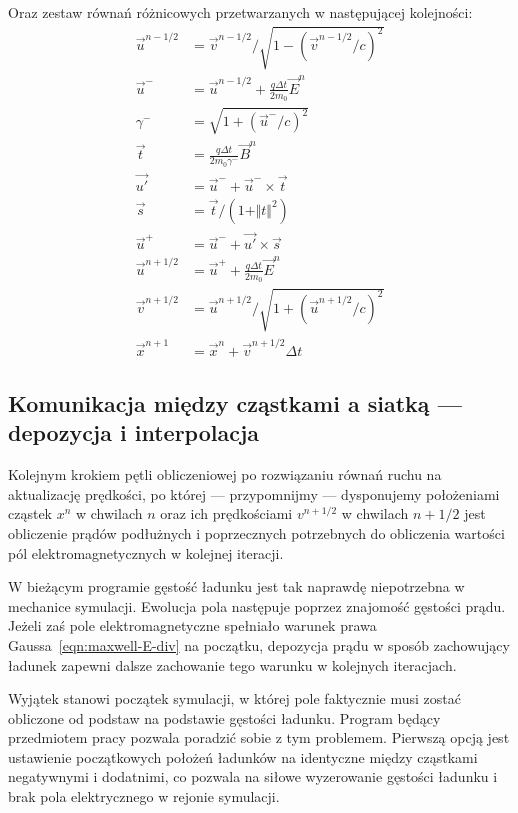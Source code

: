 Oraz zestaw równań różnicowych przetwarzanych w następującej kolejności:
\begin{align}
    \vec{u}^{n-1/2} &= \vec{v}^{n-1/2} / \sqrt{1-{(\vec{v}^{n-1/2}/c)}^2} \\
    \label{eqn:boris-pusher-start}
    \vec{u}^- &= \vec{u}^{n-1/2} + \frac{q \Delta t}{2m_0} \vec{E}^n \\
    \gamma^- &= \sqrt{1 + {\left( {\vec{u}^-} / c \right)}^2 } \\
    \vec{t} &= \frac{q \Delta t} {2 m_0 \gamma^-} \vec{B}^n \\ 
    \vec{u'} &= \vec{u}^- + \vec{u}^- \times \vec{t} \\
    \vec{s} &= \vec{t} / {(1 + \Vert t \Vert^2)} \\
    \vec{u}^+ &= \vec{u}^- + \vec{u'} \times \vec{s} \\
    \vec{u}^{n+1/2} &= \vec{u}^+ + \frac{q \Delta t}{2m_0} \vec{E}^n \\
    \vec{v}^{n+1/2} &= \vec{u}^{n+1/2} / \sqrt{1+{(\vec{u}^{n+1/2}/c)}^2} \\
    \vec{x}^{n+1} &= \vec{x}^{n} + \vec{v}^{n+1/2} \Delta t
    \label{eqn:boris-pusher-end}
\end{align}


\subsection{Komunikacja między cząstkami a siatką --- depozycja i interpolacja}

Kolejnym krokiem pętli obliczeniowej po rozwiązaniu równań ruchu na
aktualizację prędkości, po której --- przypomnijmy --- dysponujemy położeniami
cząstek $x^n$ w chwilach $n$ oraz ich prędkościami $v^{n+1/2}$ w chwilach
$n+1/2$  jest obliczenie prądów podłużnych i
poprzecznych potrzebnych do obliczenia wartości pól elektromagnetycznych w
kolejnej iteracji.

W bieżącym programie gęstość ładunku jest tak naprawdę niepotrzebna w
mechanice symulacji. Ewolucja pola następuje poprzez znajomość gęstości prądu.
Jeżeli zaś pole elektromagnetyczne spełniało warunek
prawa Gaussa~\ref{eqn:maxwell-E-div} na początku, depozycja prądu w sposób
zachowujący ładunek zapewni dalsze zachowanie tego warunku w kolejnych
iteracjach.~\cite{bunemanvillasenor}

Wyjątek stanowi początek symulacji, w której pole faktycznie musi zostać
obliczone od podstaw na podstawie gęstości ładunku. Program będący przedmiotem pracy pozwala
poradzić sobie z tym problemem. Pierwszą opcją jest ustawienie początkowych
położeń ładunków na identyczne między cząstkami negatywnymi i dodatnimi, co
pozwala na siłowe wyzerowanie gęstości ładunku i brak pola elektrycznego w
rejonie symulacji.

